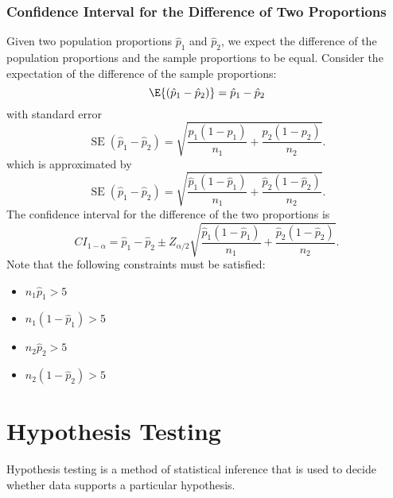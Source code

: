 \documentclass{article}
\begin{document}
\subsubsection{Confidence Interval for the Difference of Two Proportions}
Given two population proportions \(\hat{p}_1\) and \(\hat{p}_2\), we expect the difference of the population proportions
and the sample proportions to be equal. Consider the expectation of the difference of the sample proportions:
\begin{equation*}
    \E{\left( \hat{p}_1 - \hat{p}_2 \right)} = \hat{p}_1 - \hat{p}_2
\end{equation*}
with standard error
\begin{equation*}
    \operatorname{SE}\left( \hat{p}_1 - \hat{p}_2 \right) = \sqrt{\frac{p_1\left( 1 - p_1 \right)}{n_1} + \frac{p_2\left( 1 - p_2 \right)}{n_2}}.
\end{equation*}
which is approximated by
\begin{equation*}
    \operatorname{SE}\left( \hat{p}_1 - \hat{p}_2 \right) = \sqrt{\frac{\hat{p}_1\left( 1 - \hat{p}_1 \right)}{n_1} + \frac{\hat{p}_2\left( 1 - \hat{p}_2 \right)}{n_2}}.
\end{equation*}
The confidence interval for the difference of the two proportions is
\begin{equation*}
    {CI}_{1-\alpha} = \hat{p}_1 - \hat{p}_2 \pm Z_{\alpha/2} \sqrt{\frac{\hat{p}_1\left( 1 - \hat{p}_1 \right)}{n_1} + \frac{\hat{p}_2\left( 1 - \hat{p}_2 \right)}{n_2}}.
\end{equation*}
Note that the following constraints must be satisfied:
\begin{itemize}
    \item \(n_1 \hat{p}_1 > 5\)
    \item \(n_1 \left( 1 - \hat{p}_1 \right) > 5\)
    \item \(n_2 \hat{p}_2 > 5\)
    \item \(n_2 \left( 1 - \hat{p}_2 \right) > 5\)
\end{itemize}
\section{Hypothesis Testing}
Hypothesis testing is a method of statistical inference that is used to decide whether
data supports a particular hypothesis.
\end{document}
